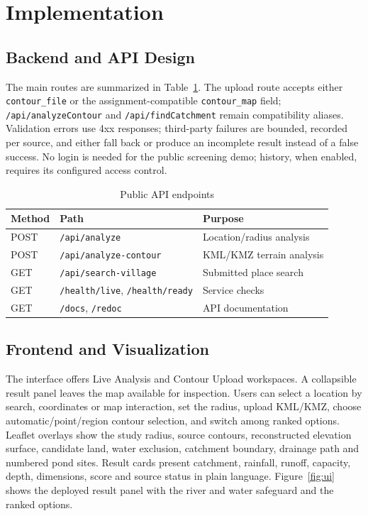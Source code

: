 \documentclass[manuscript,screen,review]{acmart}
\begin{document}
\section{Implementation}
\subsection{Backend and API Design}
The main routes are summarized in Table~\ref{tab:endpoints}. The upload route accepts either \texttt{contour\_file} or the assignment-compatible \texttt{contour\_map} field; \texttt{/api/analyzeContour} and \texttt{/api/findCatchment} remain compatibility aliases. Validation errors use 4xx responses; third-party failures are bounded, recorded per source, and either fall back or produce an incomplete result instead of a false success. No login is needed for the public screening demo; history, when enabled, requires its configured access control.

\begin{table}[h]
  \caption{Public API endpoints}
  \label{tab:endpoints}
  \begin{tabular}{p{2.0cm}p{4.1cm}p{2.5cm}}
    \toprule
    Method & Path & Purpose \\
    \midrule
    POST & \texttt{/api/analyze} & Location/radius analysis \\
    POST & \texttt{/api/analyze-contour} & KML/KMZ terrain analysis \\
    GET & \texttt{/api/search-village} & Submitted place search \\
    GET & \texttt{/health/live}, \texttt{/health/ready} & Service checks \\
    GET & \texttt{/docs}, \texttt{/redoc} & API documentation \\
    \bottomrule
  \end{tabular}
\end{table}

\subsection{Frontend and Visualization}
The interface offers Live Analysis and Contour Upload workspaces. A collapsible result panel leaves the map available for inspection. Users can select a location by search, coordinates or map interaction, set the radius, upload KML/KMZ, choose automatic/point/region contour selection, and switch among ranked options. Leaflet overlays show the study radius, source contours, reconstructed elevation surface, candidate land, water exclusion, catchment boundary, drainage path and numbered pond sites. Result cards present catchment, rainfall, runoff, capacity, depth, dimensions, score and source status in plain language. Figure~\ref{fig:ui} shows the deployed result panel with the river and water safeguard and the ranked options.
\end{document}
